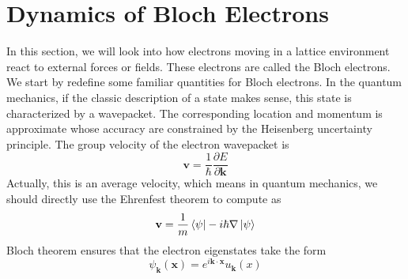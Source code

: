 \documentclass{article}
\begin{document}
\section{Dynamics of Bloch Electrons}
In this section, we will look into how electrons moving in a lattice environment react to external forces or fields. These electrons are called the Bloch electrons. We start by redefine some familiar quantities for Bloch electrons. In the quantum mechanics, if the classic description of a state makes sense, this state is characterized by a wavepacket. The corresponding location and momentum is approximate whose accuracy are constrained by the Heisenberg uncertainty principle. The group velocity of the electron wavepacket is\begin{equation}
    \mathbf{v}=\frac1\hbar\frac{\partial{E}}{\partial\mathbf{k}}
\end{equation}
Actually, this is an average velocity, which means in quantum mechanics, we should directly use the Ehrenfest theorem to compute as\begin{equation}
    \mathbf{v}=\frac1m\bra{\psi}-i\hbar\nabla\ket{\psi}
\end{equation}
Bloch theorem ensures that the electron eigenstates take the form\begin{equation}
    \psi_\mathbf{k}(\mathbf{x})=e^{i\mathbf{k}\cdot\mathbf{x}}u_\mathbf{k}(x)
\end{equation}
\end{document}
